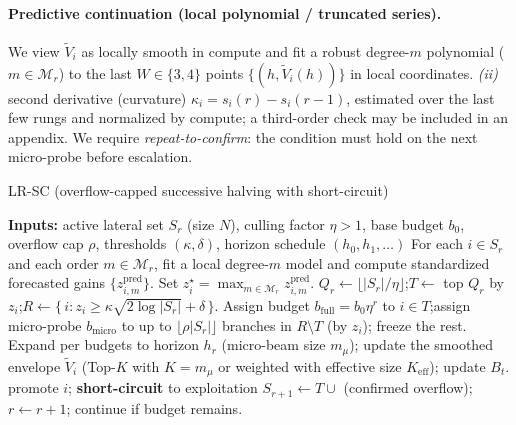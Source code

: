\documentclass{article}
\begin{document}
\paragraph{Predictive continuation (local polynomial / truncated series).}
We view $\tilde V_i$ as locally smooth in compute and fit a robust degree-$m$ polynomial ($m\!\in\!\mathcal{M}_r$)
to the last $W\in\{3,4\}$ points $\{(h,\tilde V_i(h))\}$ in local coordinates.
\emph{(ii)} second derivative (curvature) $\kappa_i = s_i(r)-s_i(r-1)$,
estimated over the last few rungs and normalized by compute; a third-order check may be included in an appendix.
We require \emph{repeat-to-confirm}: the condition must hold on the next micro-probe before escalation.

\begin{algorithm}[t]
\caption{LR-SC (overflow-capped successive halving with short-circuit)}
\label{alg:lrscr}
\begin{algorithmic}[1]
\State \textbf{Inputs:} active lateral set $S_r$ (size $N$), culling factor $\eta>1$, base budget $b_0$, overflow cap $\rho$, thresholds $(\kappa,\delta)$, horizon schedule $(h_0,h_1,\dots)$
\State For each $i\in S_r$ and each order $m\in\mathcal{M}_r$, fit a local degree-$m$ model and compute standardized forecasted gains $\{z^{\mathrm{pred}}_{i,m}\}$. Set $z_i^{\star}=\max_{m\in\mathcal{M}_r} z^{\mathrm{pred}}_{i,m}$.
\State $Q_r \leftarrow \lfloor |S_r|/\eta \rfloor$;\quad $T \leftarrow$ top $Q_r$ by $z_i$;\quad $R \leftarrow \{\,i : z_i \ge \kappa \sqrt{2\log |S_r|} + \delta\,\}$.
\State Assign budget $b_{\text{full}} = b_0 \eta^r$ to $i\in T$;\quad assign micro-probe $b_{\text{micro}}$ to up to $\lfloor \rho |S_r|\rfloor$ branches in $R\setminus T$ (by $z_i$); freeze the rest.
\State Expand per budgets to horizon $h_r$ (micro-beam size $m_{\mu}$); update the smoothed envelope $\tilde V_i$ (Top-$K$ with $K{=}m_{\mu}$ or weighted with effective size $K_{\mathrm{eff}}$); update $B_t$.
  \State promote $i$; \textbf{short-circuit} to exploitation
\EndIf
\State $S_{r+1} \leftarrow T \cup$ (confirmed overflow); $r\leftarrow r+1$; continue if budget remains.
\end{algorithmic}
\end{algorithm}

\vspace{-0.5em}
\end{document}

